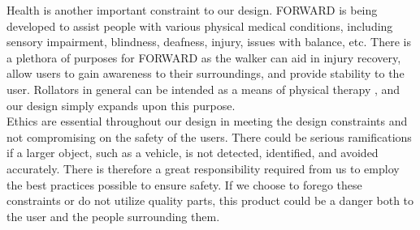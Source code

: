 \noindent Health is another important constraint to our design. FORWARD is being developed to assist people with various physical medical conditions, including sensory impairment, blindness, deafness, injury, issues with balance, etc. There is a plethora of purposes for FORWARD as the walker can aid in injury recovery, allow users to gain awareness to their surroundings, and provide stability to the user. Rollators in general can be intended as a means of physical therapy \cite{oxford_health_2014}, and our design simply expands upon this purpose.\\

\noindent Ethics are essential throughout our design in meeting the design constraints and not compromising on the safety of the users. There could be serious ramifications if a larger object, such as a vehicle, is not detected, identified, and avoided accurately. There is therefore a great responsibility required from us to employ the best practices possible to ensure safety. If we choose to forego these constraints or do not utilize quality parts, this product could be a danger both to the user and the people surrounding them. 